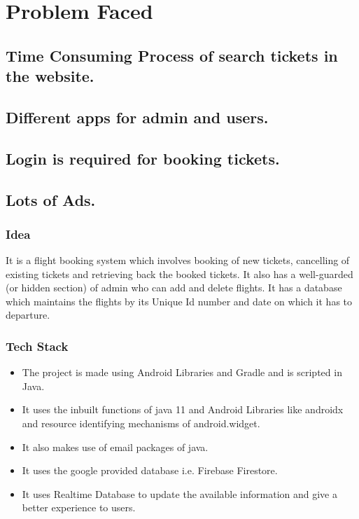 \documentclass[8pt]{beamer}
\begin{document}

\section{Problem Faced} %

\subsection{Time Consuming Process of search tickets in the website.}
\subsection{Different apps for admin and users.}
\subsection{Login is required for booking tickets.}
\subsection{Lots of Ads.} %

\begin{frame}
\frametitle{Idea}
It is a flight booking system which involves booking of new tickets, cancelling of existing tickets and retrieving back the booked tickets. It also has a well-guarded (or hidden section) of admin who can add and delete flights. It has a database which maintains the flights by its Unique Id number and date on which it has to departure.
\end{frame}

\begin{frame}
\frametitle{Tech Stack}
\begin{itemize}
\item The project is made using Android Libraries and Gradle and is scripted in Java. 
\item It uses the inbuilt functions of java 11 and Android Libraries like androidx and resource identifying mechanisms of android.widget.
\item It also makes use of email packages of java.
\item It uses the google provided database i.e. Firebase Firestore.
\item It uses Realtime Database to update the available information and give a better experience to users.
\end{itemize}
\end{frame}
\end{document}
